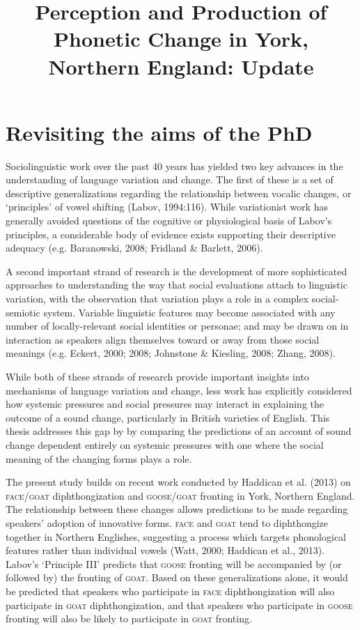 \documentclass{article}
\title{Perception and Production of Phonetic Change in York, Northern England: Update}
\begin{document}
\maketitle
\section*{Revisiting the aims of the PhD}

Sociolinguistic work over the past 40 years has yielded two key advances in the understanding of language variation and change. The first of these is a set of descriptive generalizations regarding the relationship between vocalic changes, or `principles' of vowel shifting (Labov, 1994:116). While variationist work has generally avoided questions of the cognitive or physiological basis of Labov's principles, a considerable body of evidence exists supporting their descriptive adequacy (e.g. Baranowski, 2008; Fridland \& Barlett, 2006). 

A second important strand of research is the development of more sophisticated approaches to understanding the way that social evaluations attach to linguistic variation, with the observation that variation plays a role in a complex social-semiotic system. Variable linguistic features may become associated with any number of locally-relevant social identities or personae; and may be drawn on in interaction as speakers align themselves toward or away from those social meanings (e.g. Eckert, 2000; 2008; Johnstone \& Kiesling, 2008; Zhang, 2008).  

While both of these strands of research provide important insights into mechanisms of language variation and change, less work has explicitly considered how systemic pressures and social pressures may interact in explaining the outcome of a sound change, particularly in British varieties of English. This thesis addresses this gap by by  comparing the predictions of an account of sound change dependent entirely on systemic pressures with one where the social meaning of the changing forms plays a role.

The present study builds on recent work conducted by Haddican et al. (2013) on \textsc{face/goat} diphthongization and \textsc{goose/goat} fronting in York, Northern England. The relationship between these changes allows predictions to be made regarding speakers' adoption of innovative forms. \textsc{face} and \textsc{goat} tend to diphthongize together in Northern Englishes, suggesting a process which targets phonological features rather than individual vowels (Watt, 2000; Haddican et al., 2013). Labov's `Principle III' predicts that \textsc{goose} fronting will be accompanied by (or followed by) the fronting of \textsc{goat}. Based on these generalizations alone, it would be predicted that speakers who participate in \textsc{face} diphthongization will also participate in \textsc{goat} diphthongization, and that speakers who participate in \textsc{goose} fronting will also be likely to participate in \textsc{goat} fronting. 
\end{document}
